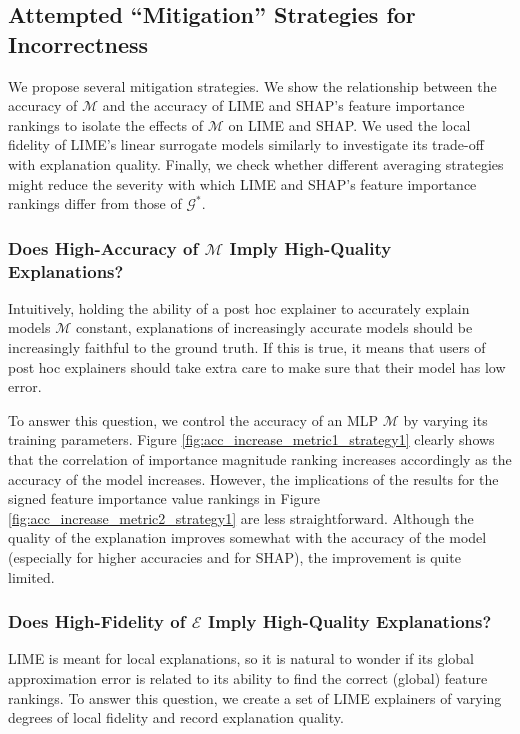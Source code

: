 \documentclass[12pt]{article}    %
\begin{document}
\subsection*{Attempted ``Mitigation'' Strategies for Incorrectness}
\label{sec:incorrectness_mitigation} %
    We propose several mitigation strategies. We show the relationship between the accuracy of $\mathcal{M}$ and the accuracy of LIME and SHAP's feature importance rankings to isolate the effects of $\mathcal{M}$ on LIME and SHAP. We used the local fidelity of LIME's linear surrogate models similarly to investigate its trade-off with explanation quality. Finally, we check whether different averaging strategies might reduce the severity with which LIME and SHAP's feature importance rankings differ from those of $\mathcal{G^*}$. 


\subsubsection*{Does High-Accuracy of $\mathcal{M}$ Imply High-Quality Explanations?}
\label{sec:m_fidelity}
    Intuitively, holding the ability of a post hoc explainer to accurately explain models $\mathcal{M}$ constant, explanations of increasingly accurate models should be increasingly faithful to the ground truth. If this is true, it means that users of post hoc explainers should take extra care to make sure that their model has low error. 

    To answer this question, we control the accuracy of an MLP $\mathcal{M}$ by varying its training parameters.
    Figure \ref{fig:acc_increase_metric1_strategy1} clearly shows that the correlation of importance magnitude ranking increases accordingly as the accuracy of the model increases. However, the implications of the results for the signed feature importance value rankings in Figure \ref{fig:acc_increase_metric2_strategy1} are less straightforward. Although the quality of the explanation improves somewhat with the accuracy of the model (especially for higher accuracies and for SHAP), the improvement is quite limited.




\subsubsection*{Does High-Fidelity of $\mathcal{E}$ Imply High-Quality Explanations?} 
\label{sec:e_fidelity}
    LIME is meant for local explanations, so it is natural to wonder if its global approximation error is related to its ability to find the correct (global) feature rankings. To answer this question, we create a set of LIME explainers of varying degrees of local fidelity and record explanation quality.
\end{document}
